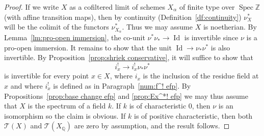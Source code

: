 \documentclass[JEP,XML,SOM,Unicode]{cedram}
\newcommand{\T}{\mathscr T}
\DeclareMathOperator{\Id}{Id}
\DeclareMathOperator{\spec}{Spec}
\newcommand{\ZZ} {\mathbb Z}
\newcommand{\QQ} {\mathbb Q}
\theoremstyle{remark}
\theoremstyle{definition}
\numberwithin{equation}{thm}
\begin{document}
\begin{proof}
If we write $X$ as a cofiltered limit of schemes $X_\alpha$ of finite type over $\spec{\ZZ}$ (with affine transition maps), then by continuity (Definition~\ref{df:continuity}) $\nu_X^*$ will be the colimit of the functors $\nu_{X_\alpha}^*$.
Thus we may assume $X$ is noetherian.
By Lemma~\ref{lm:pro-open immersion}, the co-unit $\nu^*\nu_* \to \Id$ is invertible since $\nu$ is a pro-open immersion.
It remains to show that the unit $\Id \to \nu_*\nu^*$ is also invertible.
By Proposition~\ref{prop:shriek conservative}, it will suffice to show that
\[
i_x^! \to i_x^!\nu_*\nu^*
\]
is invertible for every point $x \in X$, where $i_x$ is the inclusion of the residue field at $x$ and where $i_x^!$ is defined as in Paragraph~\ref{num:f^! efp}.
By Propositions~\ref{prop:base change efp} and \ref{prop:Ex^*! efp} we may thus assume that $X$ is the spectrum of a field $k$.
If $k$ is of characteristic $0$, then $\nu$ is an isomorphism so the claim is obvious.
If $k$ is of positive characteristic, then both $\T(X)$ and $\T(X_\QQ)$ are zero by assumption, and the result follows.
\end{proof}
\end{document}
